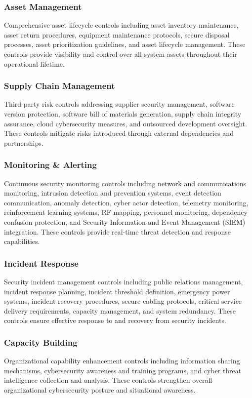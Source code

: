 \documentclass[binding=0.6cm]{sapthesis}
\begin{document}
\subsubsection{Asset Management}
Comprehensive asset lifecycle controls including asset inventory maintenance, asset return procedures, equipment maintenance protocols, secure disposal processes, asset prioritization guidelines, and asset lifecycle management. These controls provide visibility and control over all system assets throughout their operational lifetime.

\subsubsection{Supply Chain Management}
Third-party risk controls addressing supplier security management, software version protection, software bill of materials generation, supply chain integrity assurance, cloud cybersecurity measures, and outsourced development oversight. These controls mitigate risks introduced through external dependencies and partnerships.

\subsubsection{Monitoring \& Alerting}
Continuous security monitoring controls including network and communications monitoring, intrusion detection and prevention systems, event detection communication, anomaly detection, cyber actor detection, telemetry monitoring, reinforcement learning systems, RF mapping, personnel monitoring, dependency confusion protection, and Security Information and Event Management (SIEM) integration. These controls provide real-time threat detection and response capabilities.

\subsubsection{Incident Response}
Security incident management controls including public relations management, incident response planning, incident threshold definition, emergency power systems, incident recovery procedures, secure cabling protocols, critical service delivery requirements, capacity management, and system redundancy. These controls ensure effective response to and recovery from security incidents.

\subsubsection{Capacity Building}
Organizational capability enhancement controls including information sharing mechanisms, cybersecurity awareness and training programs, and cyber threat intelligence collection and analysis. These controls strengthen overall organizational cybersecurity posture and situational awareness.
\end{document}
